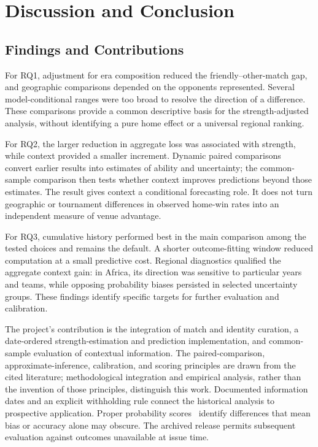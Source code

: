 \section{Discussion and Conclusion}
\subsection{Findings and Contributions}

For RQ1, adjustment for era composition reduced the friendly--other-match gap, and geographic comparisons depended on the opponents represented. Several model-conditional ranges were too broad to resolve the direction of a difference. These comparisons provide a common descriptive basis for the strength-adjusted analysis, without identifying a pure home effect or a universal regional ranking.

For RQ2, the larger reduction in aggregate loss was associated with strength, while context provided a smaller increment. Dynamic paired comparisons~\citep{glickman1999dynamic} convert earlier results into estimates of ability and uncertainty; the common-sample comparison then tests whether context improves predictions beyond those estimates. The result gives context a conditional forecasting role. It does not turn geographic or tournament differences in observed home-win rates into an independent measure of venue advantage.

For RQ3, cumulative history performed best in the main comparison among the tested choices and remains the default. A shorter outcome-fitting window reduced computation at a small predictive cost. Regional diagnostics qualified the aggregate context gain: in Africa, its direction was sensitive to particular years and teams, while opposing probability biases persisted in selected uncertainty groups. These findings identify specific targets for further evaluation and calibration.

The project's contribution is the integration of match and identity curation, a date-ordered strength-estimation and prediction implementation, and common-sample evaluation of contextual information. The paired-comparison, approximate-inference, calibration, and scoring principles are drawn from the cited literature; methodological integration and empirical analysis, rather than the invention of those principles, distinguish this work. Documented information dates and an explicit withholding rule connect the historical analysis to prospective application. Proper probability scores~\citep{gneiting2007scoring} identify differences that mean bias or accuracy alone may obscure. The archived release permits subsequent evaluation against outcomes unavailable at issue time.

